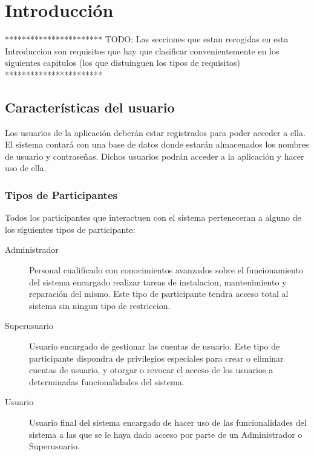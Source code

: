 \chapter{Introducción}

    ***********************\newline
    TODO: Las secciones que estan recogidas en esta Introduccion son requisitos que hay que clasificar convenientemente en los siguientes capitulos (los que distuinguen los tipos de requisitos)
    ***********************\newline

\section{Características del usuario}
    Los usuarios de la aplicación deberán estar registrados para poder acceder a ella. El sistema contará con una base de datos donde estarán almacenados los nombres de usuario y contrase\~nas. Dichos usuarios podrán acceder a la aplicación y hacer uso de ella.

    \subsection{Tipos de Participantes}
        Todos los participantes que interactuen con el sistema perteneceran a alguno de los siguientes tipos de participante:
        
        \begin{description}
            \item[Administrador] Personal cualificado con conocimientos avanzados sobre el funcionamiento del sistema encargado realizar tareas de instalacion, mantenimiento y reparación del mismo. Este tipo de participante tendra acceso total al sistema sin ningun tipo de restriccion.

            \item[Superusuario] Usuario encargado de gestionar las cuentas de usuario. Este tipo de participante dispondra de privilegios especiales para crear o eliminar cuentas de usuario, y otorgar o revocar el acceso de los usuarios a determinadas funcionalidades del sistema.

            \item[Usuario] Usuario final del sistema encargado de hacer uso de las funcionalidades del sistema a las que se le haya dado acceso por parte de un Administrador o Superusuario.
        \end{description}

